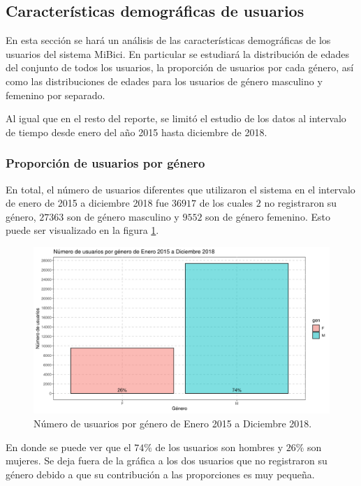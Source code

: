 \subsection{Características demográficas de usuarios}
En esta sección se hará un análisis de las características demográficas de los usuarios del sistema MiBici. En particular se estudiará la distribución de edades del conjunto de todos los usuarios, la proporción de usuarios por cada género, así como las distribuciones de edades para los usuarios de género masculino y femenino por separado.
\par Al igual que en el resto del reporte, se limitó el estudio de los datos al intervalo de tiempo desde enero del año 2015 hasta diciembre de 2018.
\subsubsection{Proporción de usuarios por género}
En total, el número de usuarios diferentes que utilizaron el sistema en el intervalo de enero de 2015 a diciembre 2018 fue $36917$ de los cuales $2$ no registraron su género, $27363$ son de género masculino y $9552$ son de género femenino. Esto puede ser visualizado en la figura \ref{fig:genderprop}.
\begin{figure}[H]
	\centering
	\includegraphics[width=0.7\linewidth]{Graphics/genderProp}
	\caption{Número de usuarios por género de Enero 2015 a Diciembre 2018.}
	\label{fig:genderprop}
\end{figure}
En donde se puede ver que el $74\%$ de los usuarios son hombres y $26\%$ son mujeres. Se deja fuera de la gráfica a los dos usuarios que no registraron su género debido a que su contribución a las proporciones es muy pequeña.
